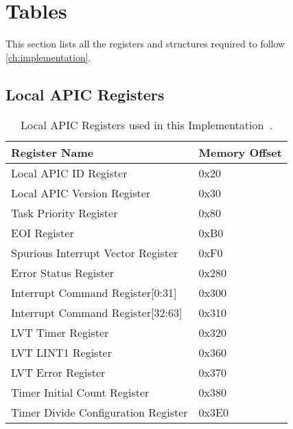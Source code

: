 \chapter{Tables}
\label{ch:tables}

This section lists all the registers and structures required to follow \autoref{ch:implementation}.

\clearpage

\renewcommand{\arraystretch}{1.2} %

\section{Local APIC Registers}
\label{sec:localapicregisters}

\begin{table}[H]
  \centering
  \begin{tabularx}{1.0\textwidth}{| X | X |}
    \hline
    \textbf{Register Name}              & \textbf{Memory Offset} \\ \hline\hline
    Local APIC ID Register              & 0x20                   \\ \hline
    Local APIC Version Register         & 0x30                   \\ \hline
    Task Priority Register              & 0x80                   \\ \hline
    EOI Register                        & 0xB0                   \\ \hline
    Spurious Interrupt Vector Register  & 0xF0                   \\ \hline
    Error Status Register               & 0x280                  \\ \hline
    Interrupt Command Register[0:31]    & 0x300                  \\ \hline
    Interrupt Command Register[32:63]   & 0x310                  \\ \hline
    LVT Timer Register                  & 0x320                  \\ \hline
    LVT LINT1 Register                  & 0x360                  \\ \hline
    LVT Error Register                  & 0x370                  \\ \hline
    Timer Initial Count Register        & 0x380                  \\ \hline
    Timer Divide Configuration Register & 0x3E0                  \\ \hline
  \end{tabularx}
  \caption{Local APIC Registers used in this Implementation~\autocite[sec.~3.11.4.1]{ia32}.}
  \label{tab:lapicregs}
\end{table}

